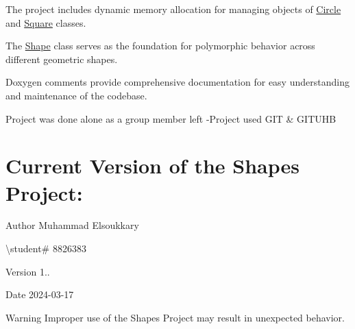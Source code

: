 \begin{DoxyItemize}
\item The project includes dynamic memory allocation for managing objects of \mbox{\hyperlink{class_circle}{Circle}} and \mbox{\hyperlink{class_square}{Square}} classes.
\item The \mbox{\hyperlink{class_shape}{Shape}} class serves as the foundation for polymorphic behavior across different geometric shapes.
\item Doxygen comments provide comprehensive documentation for easy understanding and maintenance of the codebase.
\item Project was done alone as a group member left -\/Project used G\+IT \& G\+I\+T\+U\+HB
\end{DoxyItemize}



 \hypertarget{index_version}{}\section{Current Version of the Shapes Project\+:}\label{index_version}

\begin{DoxyItemize}
\item \begin{DoxyAuthor}{Author}
Muhammad Elsoukkary 
\end{DoxyAuthor}

\item \textbackslash{}student\# 8826383 
\item \begin{DoxyVersion}{Version}
1.. 
\end{DoxyVersion}

\item \begin{DoxyDate}{Date}
2024-\/03-\/17 
\end{DoxyDate}

\item \begin{DoxyWarning}{Warning}
Improper use of the Shapes Project may result in unexpected behavior. 
\end{DoxyWarning}

\end{DoxyItemize}